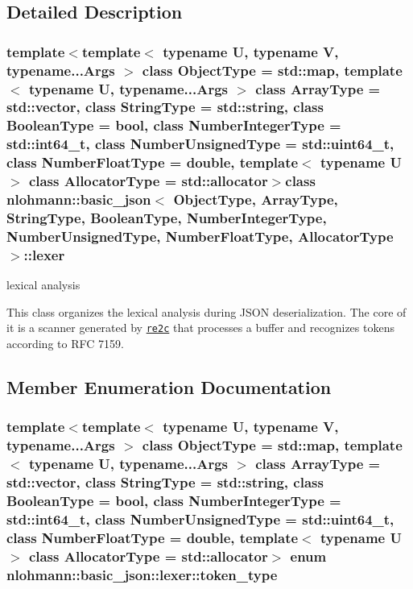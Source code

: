 \subsection{Detailed Description}
\subsubsection*{template$<$template$<$ typename U, typename V, typename...\-Args $>$ class Object\-Type = std\-::map, template$<$ typename U, typename...\-Args $>$ class Array\-Type = std\-::vector, class String\-Type = std\-::string, class Boolean\-Type = bool, class Number\-Integer\-Type = std\-::int64\-\_\-t, class Number\-Unsigned\-Type = std\-::uint64\-\_\-t, class Number\-Float\-Type = double, template$<$ typename U $>$ class Allocator\-Type = std\-::allocator$>$class nlohmann\-::basic\-\_\-json$<$ Object\-Type, Array\-Type, String\-Type, Boolean\-Type, Number\-Integer\-Type, Number\-Unsigned\-Type, Number\-Float\-Type, Allocator\-Type $>$\-::lexer}

lexical analysis 

This class organizes the lexical analysis during J\-S\-O\-N deserialization. The core of it is a scanner generated by \href{http://re2c.org}{\tt re2c} that processes a buffer and recognizes tokens according to R\-F\-C 7159. 

\subsection{Member Enumeration Documentation}
\hypertarget{classnlohmann_1_1basic__json_1_1lexer_a96887d6cd131e3d3a85a9d71fbdbcdf7_a96887d6cd131e3d3a85a9d71fbdbcdf7}{
\subsubsection[{token\-\_\-type}]{\setlength{\rightskip}{0pt plus 5cm}template$<$template$<$ typename U, typename V, typename...\-Args $>$ class Object\-Type = std\-::map, template$<$ typename U, typename...\-Args $>$ class Array\-Type = std\-::vector, class String\-Type  = std\-::string, class Boolean\-Type  = bool, class Number\-Integer\-Type  = std\-::int64\-\_\-t, class Number\-Unsigned\-Type  = std\-::uint64\-\_\-t, class Number\-Float\-Type  = double, template$<$ typename U $>$ class Allocator\-Type = std\-::allocator$>$ enum {\bf nlohmann\-::basic\-\_\-json\-::lexer\-::token\-\_\-type}\hspace{0.3cm}{\ttfamily [strong]}}}\label{classnlohmann_1_1basic__json_1_1lexer_a96887d6cd131e3d3a85a9d71fbdbcdf7_a96887d6cd131e3d3a85a9d71fbdbcdf7}


